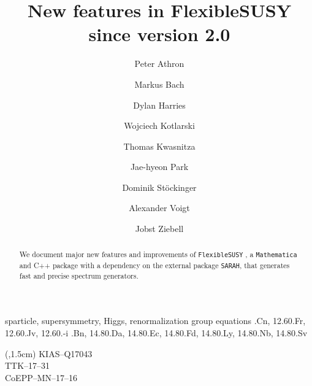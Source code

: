 \documentclass[final,3p,11pt,pdflatex]{elsarticle}
\makeatletter
\newcommand{\sarah}{\texttt{SARAH}\@\xspace}
\newcommand{\fs}{\texttt{FlexibleSUSY}\@\xspace}
\newcommand{\mathematica}{\texttt{Ma\-the\-ma\-ti\-ca}\xspace}
\makeatother
\begin{document}
\begin{frontmatter}
 \vspace*{0.5cm}
 \title{\Large\bf New features in FlexibleSUSY since version 2.0}

\author[Monash]{Peter Athron}
\author[dresden]{Markus Bach}
\author[adelaide,prague]{Dylan Harries}
\author[dresden]{Wojciech Kotlarski}
\author[dresden]{Thomas Kwasnitza}
\author[kiasquc]{Jae-hyeon Park}
\author[dresden]{Dominik St\"ockinger}
\author[rwth]{Alexander Voigt}
\author[dresden]{Jobst Ziebell}
\address[Monash]{ARC Centre of Excellence for Particle Physics at
  the Terascale, School of Physics, Monash University, Melbourne,
  Victoria 3800, Australia}
\address[dresden]{Institut f\"ur Kern- und Teilchenphysik,
TU Dresden, Zellescher Weg 19, 01069 Dresden, Germany}
\address[adelaide]{ARC Centre of Excellence for Particle Physics at
the Terascale, Department of Physics, The University of Adelaide,
Adelaide, South Australia 5005, Australia}
\address[prague]{Institute of Particle and Nuclear Physics, Faculty of
  Mathematics and Physics, Charles University in Prague, V
  Hole\v{s}ovi\v{c}k\'{a}ch 2, 180 00 Praha 8, Czech Republic}
\address[kiasquc]{Quantum Universe Center,
Korea Institute for Advanced Study,
85 Hoegiro Dongdaemungu,
Seoul 02455, Republic of Korea}
\address[rwth]{Institute for Theoretical Particle Physics and Cosmology, RWTH Aachen University, 52074 Aachen, Germany}

  \begin{abstract}
    We document major new features and improvements of \fs
    \cite{Athron:2014yba,Athron:2017fvs}, a \mathematica and C++
    package with a dependency on the external package \sarah, that
    generates fast and precise spectrum generators.
  \end{abstract}

\begin{keyword}
sparticle,
supersymmetry,
Higgs,
renormalization group equations
.Cn, 12.60.Fr, 12.60.Jv, 12.60.-i
.Bn, 14.80.Da, 14.80.Ec, 14.80.Fd, 14.80.Ly, 14.80.Nb, 14.80.Sv
\end{keyword}
\end{frontmatter}

\begin{textblock*}{10em}(\textwidth,1.5cm)
\raggedleft\noindent\footnotesize
KIAS--Q17043 \\
TTK--17--31 \\
CoEPP--MN--17--16
\end{textblock*}
\end{document}
